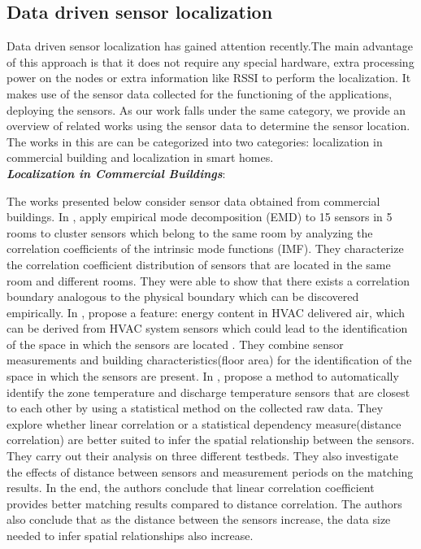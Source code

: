 \subsection{Data driven sensor localization}

Data driven sensor localization has gained attention recently.The main advantage of this approach is that it does not require any special hardware, extra processing power on the nodes or extra information like RSSI to perform the localization.
It makes use of the sensor data collected for the functioning of the applications, deploying the sensors. 
 As our work falls under the same category, we provide an overview of related works using the sensor data to determine the sensor location. The works in this are can be categorized into two categories: localization in commercial building and localization in smart homes.\\
\textbf{\textit{Localization in Commercial Buildings}}:\par
The works presented below consider sensor data obtained from commercial buildings.
 In \cite{Hong:2013:TAS:2528282.2528302}, \citeauthor{Hong:2013:TAS:2528282.2528302} 
 apply empirical mode decomposition (EMD) to 15 sensors in 5 rooms to cluster sensors which belong to the same room by analyzing the correlation coefficients of the intrinsic mode functions (IMF). They characterize the correlation coefficient distribution of sensors that are located in the
 same room and different rooms. They were able to show that there exists a correlation boundary analogous to the physical boundary which can be discovered empirically. 
In \cite{doi:10.1061/9780784413616.226}, \citeauthor{doi:10.1061/9780784413616.226} propose a feature: energy content in HVAC delivered air, which can be derived from HVAC system sensors which could lead to the identification of the space in which the sensors are located . They combine sensor measurements and building characteristics(floor area) for the identification of the space in which the sensors are present.
In \cite{Koc:2014:CLC:2674061.2674075}, \citeauthor{Koc:2014:CLC:2674061.2674075} propose a method to automatically identify the zone temperature and discharge temperature sensors that are closest to each other by using a statistical method on the collected raw data. They explore whether linear correlation or a statistical dependency measure(distance correlation) are better suited to infer the spatial relationship between the sensors. They carry out their analysis on three different testbeds. They also investigate the effects of distance between sensors and measurement periods on the matching results. In the end, the authors conclude that linear correlation coefficient provides better matching results compared to distance correlation. The authors also conclude that as the distance between the sensors increase, the data size needed to infer spatial relationships also increase.
